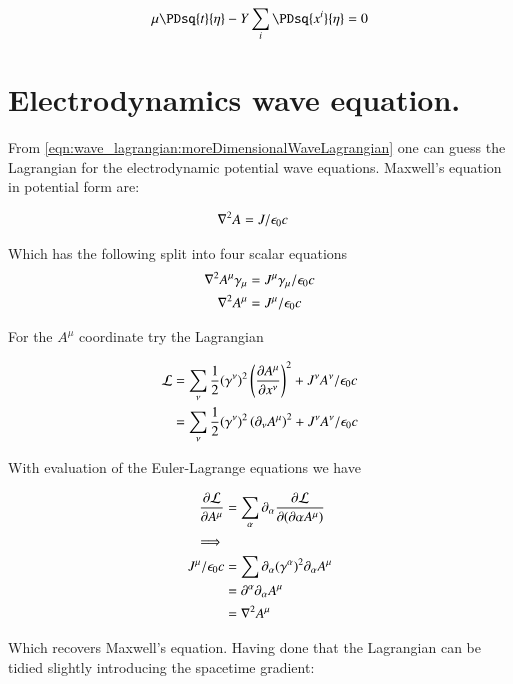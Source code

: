 \begin{align*}
\mu \PDsq{t}{\eta} - Y \sum_i \PDsq{x^i}{\eta} &= 0 \\
\end{align*}

\section{Electrodynamics wave equation. }

From \ref{eqn:wave_lagrangian:moreDimensionalWaveLagrangian} one can guess the Lagrangian for the electrodynamic potential wave equations.  Maxwell's equation in potential form are:

\begin{align}\label{eqn:wave_lagrangian:maxwellPotential}
\grad^2 A &= J/\epsilon_0 c
\end{align}

Which has the following split into four scalar equations
\begin{align*}
\grad^2 A^\mu \gamma_\mu &= J^\mu \gamma_\mu/\epsilon_0 c \\
\grad^2 A^\mu &= J^\mu /\epsilon_0 c
\end{align*}

For the $A^\mu$ coordinate try the Lagrangian

\begin{align*}
\LL 
&= \sum_\nu \inv{2} (\gamma^\nu)^2 \left( \PD{x^\nu}{A^\mu} \right)^2 + J^\nu A^\nu / \epsilon_0 c \\
&= \sum_\nu \inv{2} (\gamma^\nu)^2 \left(\partial_{\nu}{A^\mu}\right)^2 + J^\nu A^\nu / \epsilon_0 c \\
\end{align*}

With evaluation of the Euler-Lagrange equations we have

\begin{align*}
\PD{A^\mu}{\LL} &= \sum_\alpha \partial_{\alpha} \PD{(\partial{\alpha}{A^\mu})}{\LL} \\
\implies \\
J^\mu/\epsilon_0 c
&= \sum \partial_\alpha (\gamma^\alpha)^2 \partial_{\alpha}{A^\mu} \\
&= \partial^\alpha \partial_{\alpha}{A^\mu} \\
&= \grad^2 A^\mu \\
\end{align*}

Which recovers Maxwell's equation.  Having done that the Lagrangian can be tidied slightly introducing the spacetime gradient:


